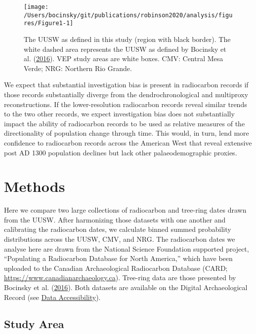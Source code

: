 \documentclass[
]{article}
\begin{document}
\begin{figure}

{\centering \texttt{[image: /Users/bocinsky/git/publications/robinson2020/analysis/figures/Figure1-1]} 

}

\caption{The UUSW as defined in this study (region with black border). The white dashed area represents the UUSW as defined by Bocinsky et al. (\protect\hyperlink{ref-Bocinsky2016}{2016}). VEP study areas are white boxes. CMV: Central Mesa Verde; NRG: Northern Rio Grande.}\label{fig:Figure1}
\end{figure}

We expect that substantial investigation bias is present in radiocarbon records if those records substantially diverge from the dendrochronological and multiproxy reconstructions. If the lower-resolution radiocarbon records reveal similar trends to the two other records, we expect investigation bias does not substantially impact the ability of radiocarbon records to be used as relative measures of the directionality of population change through time. This would, in turn, lend more confidence to radiocarbon records across the American West that reveal extensive post AD 1300 population declines but lack other palaeodemographic proxies.

\hypertarget{methods}{%
\section*{Methods}\label{methods}}

Here we compare two large collections of radiocarbon and tree-ring dates drawn from the UUSW. After harmonizing those datasets with one another and calibrating the radiocarbon dates, we calculate binned summed probability distributions across the UUSW, CMV, and NRG. The radiocarbon dates we analyse here are drawn from the National Science Foundation supported project, ``Populating a Radiocarbon Database for North America,'' which have been uploaded to the Canadian Archaeological Radiocarbon Database (CARD; \url{https://www.canadianarchaeology.ca}). Tree-ring data are those presented by Bocinsky et al. (\protect\hyperlink{ref-Bocinsky2016}{2016}). Both datasets are available on the Digital Archaeological Record (see \protect\hyperlink{data-accessibility}{Data Accessibility}).

\hypertarget{study-area}{%
\subsection*{Study Area}\label{study-area}}
\end{document}

